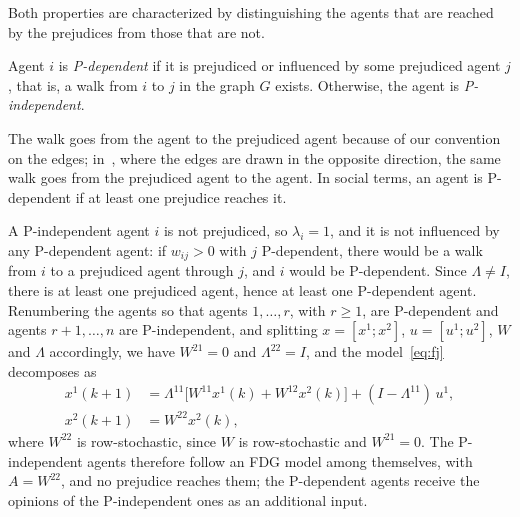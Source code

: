 Both properties are characterized by distinguishing the agents that are reached by the
prejudices from those that are not.

\begin{definition}
\label{def:p-dependent}
Agent $i$ is \emph{P-dependent} if it is prejudiced or influenced by some prejudiced
agent $j$, that is, a walk from $i$ to $j$ in the graph $G$ exists. Otherwise, the
agent is \emph{P-independent}.
\end{definition}

The walk goes from the agent to the prejudiced agent because of our convention on the
edges; in~\cite{proskurnikov2017tutorial}, where the edges are drawn in the opposite
direction, the same walk goes from the prejudiced agent to the agent. In social terms,
an agent is P-dependent if at least one prejudice reaches it.

A P-independent agent $i$ is not prejudiced, so $\lambda_i = 1$, and it is not
influenced by any P-dependent agent: if $w_{ij} > 0$ with $j$ P-dependent, there would
be a walk from $i$ to a prejudiced agent through $j$, and $i$ would be P-dependent.
Since $\Lambda \neq I$, there is at least one prejudiced agent, hence at least one
P-dependent agent. Renumbering the agents so that agents $1, \dots, r$, with
$r \geq 1$, are P-dependent and agents $r+1, \dots, n$ are P-independent, and
splitting $x = [x^1; x^2]$, $u = [u^1; u^2]$, $W$ and $\Lambda$ accordingly, we
have $W^{21} = 0$ and $\Lambda^{22} = I$, and the model~\eqref{eq:fj} decomposes
as~\cite{proskurnikov2017tutorial}
\begin{align}
  x^1(k+1) &= \Lambda^{11}\bigl[W^{11} x^1(k) + W^{12} x^2(k)\bigr]
              + (I - \Lambda^{11})\, u^1, \label{eq:fj-dep}\\
  x^2(k+1) &= W^{22} x^2(k), \label{eq:fj-indep}
\end{align}
where $W^{22}$ is row-stochastic, since $W$ is row-stochastic and $W^{21} = 0$. The
P-independent agents therefore follow an FDG
model among themselves, with $A = W^{22}$, and no prejudice reaches them; the
P-dependent agents receive the opinions of the P-independent ones as an additional
input.

